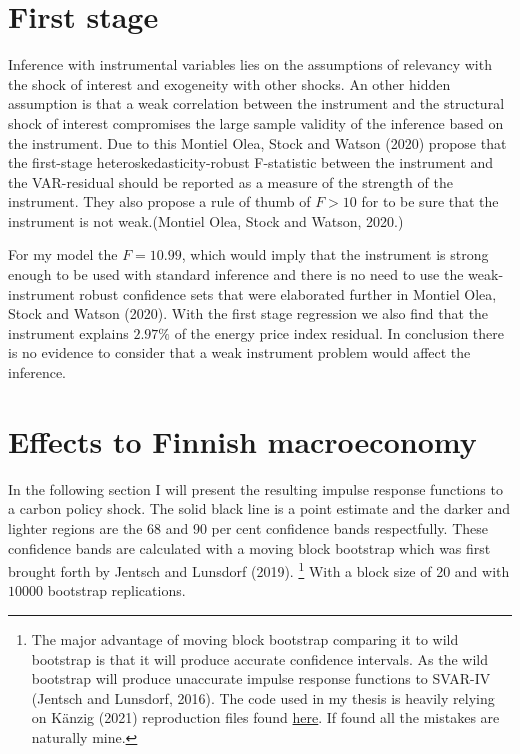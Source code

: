 \documentclass[
  12pt,
  a4paper,
]{report}
\begin{document}
\hypertarget{first-stage}{%
\section{First stage}\label{first-stage}}

Inference with instrumental variables lies on the assumptions of relevancy with the shock of interest and exogeneity with other shocks. An other hidden assumption is that a weak correlation between the instrument and the structural shock of interest compromises the large sample validity of the inference based on the instrument. Due to this Montiel Olea, Stock and Watson (2020) propose that the first-stage heteroskedasticity-robust F-statistic between the instrument and the VAR-residual should be reported as a measure of the strength of the instrument. They also propose a rule of thumb of \(F > 10\) for to be sure that the instrument is not weak.(Montiel Olea, Stock and Watson, 2020.)

For my model the \(F = 10.99\), which would imply that the instrument is strong enough to be used with standard inference and there is no need to use the weak-instrument robust confidence sets that were elaborated further in Montiel Olea, Stock and Watson (2020). With the first stage regression we also find that the instrument explains \(2.97\%\) of the energy price index residual. In conclusion there is no evidence to consider that a weak instrument problem would affect the inference.

\hypertarget{effects-to-finnish-macroeconomy}{%
\section{Effects to Finnish macroeconomy}\label{effects-to-finnish-macroeconomy}}

In the following section I will present the resulting impulse response functions to a carbon policy shock. The solid black line is a point estimate and the darker and lighter regions are the 68 and 90 per cent confidence bands respectfully. These confidence bands are calculated with a moving block bootstrap which was first brought forth by Jentsch and Lunsdorf (2019). \footnote{The major advantage of moving block bootstrap comparing it to wild bootstrap is that it will produce accurate confidence intervals. As the wild bootstrap will produce unaccurate impulse response functions to SVAR-IV (Jentsch and Lunsdorf, 2016). The code used in my thesis is heavily relying on Känzig (2021) reproduction files found \href{https://github.com/dkaenzig/replicationOilSupplyNews}{here}. If found all the mistakes are naturally mine.} With a block size of 20 and with \(10 000\) bootstrap replications.
\end{document}
